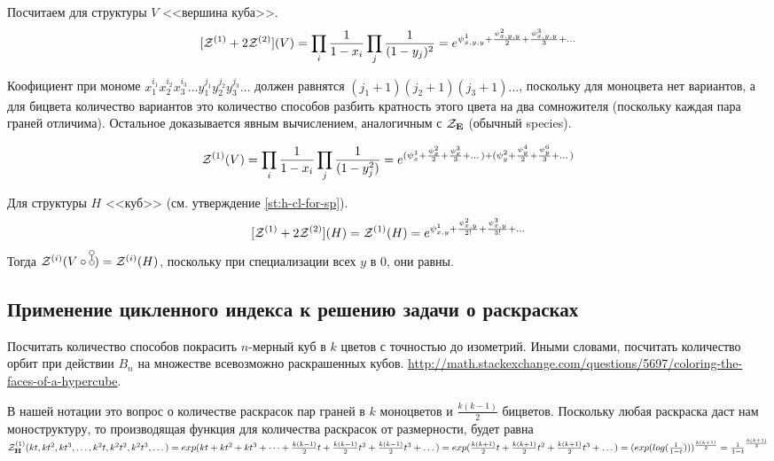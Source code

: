 \begin{example}
Посчитаем для структуры $V$ <<вершина куба>>.
$$
[\mathcal Z^{(1)} + 2\mathcal Z^{(2)}](V) = \prod_i \frac{1}{1 - x_i} \prod_j \frac{1}{(1 -
y_j)^2} = e^{\psi_{x,y,y}^{1} + \frac{\psi_{x,y,y}^{2}}{2} +
\frac{\psi_{x,y,y}^{3}}{3} + \dots} 
$$

Коофициент при мономе $x_1^{i_1}x_2^{i_2}x_3^{i_3} \ldots
y_1^{j_1}y_2^{j_2}y_3^{j_3} \ldots$ должен равнятся $(j_1+1)(j_2+1)(j_3+1)
\ldots$, поскольку для моноцвета нет вариантов, а для бицвета количество
вариантов это количество способов разбить кратность этого цвета на два
сомножителя (поскольку каждая пара граней отличима). Остальное доказывается
явным вычислением, аналогичным с $\mathcal Z_{\mathbf E}$ (обычный species).

$$
\mathcal Z^{(1)}(V) = \prod_i \frac{1}{1 - x_i} \prod_j \frac{1}{(1 -
y_j^2)} = e^{(\psi_{x}^{1} + \frac{\psi_{x}^{2}}{2} + \frac{\psi_{x}^{3}}{3} +
\dots) + (\psi_{y}^{2} + \frac{\psi_{y}^{4}}{2} +
\frac{\psi_{y}^{6}}{3} + \dots)} 
$$


Для структуры $H$ <<куб>> (см. утверждение \ref{st:h-cl-for-sp}).
$$
[\mathcal Z^{(1)} + 2\mathcal Z^{(2)}](H) = \mathcal Z^{(1)}(H) = e^{\psi_{x,y}^{1} +
\frac{\psi_{x,y}^{2}}{2!} + \frac{\psi_{x,y}^{3}}{3!} + \dots} 
$$
Тогда $\Zi(V \circ \dA) = \Zi(H)$, поскольку
при специализации всех $y$ в $0$, они равны.
\end{example}

\subsection{Применение цикленного индекса к решению задачи о раскрасках}
\begin{problem}
Посчитать количество способов покрасить $n$-мерный куб в $k$ цветов с точностью
до изометрий. Иными словами, посчитать количество орбит при действии $B_n$ на
множестве всевозможно раскрашенных кубов. \url{http://math.stackexchange.com/questions/5697/coloring-the-faces-of-a-hypercube}.
\end{problem}
\begin{solution}
В нашей нотации это вопрос о количестве раскрасок пар граней в $k$ моноцветов и
$\frac{k(k-1)}{2}$ бицветов. Поскольку любая раскраска даст нам моноструктуру,
то производящая функция для количества раскрасок от размерности, будет равна
$\mathcal Z^{(1)}_{\mathbf H}(kt, kt^2, kt^3, \dots, k^2t,
k^2t^2, k^2t^3, \dots) = exp(kt + kt^2 + kt^3 + \dots
+ \frac{k(k-1)}{2}t + \frac{k(k-1)}{2}t^2 + \frac{k(k-1)}{2}t^3 + \dots) =
exp(\frac{k(k+1)}{2}t + \frac{k(k+1)}{2}t^2 + \frac{k(k+1)}{2}t^3 + \dots) =
(exp(log(\frac{1}{1-t})))^{\frac{k(k+1)}{2}} = \frac{1}{1-t}^{\frac{k(k+1)}{2}}$
\end{solution}
